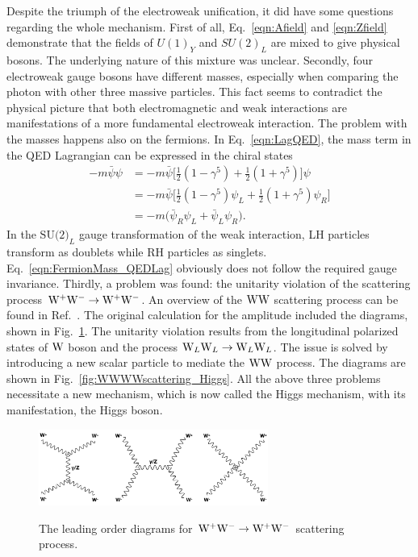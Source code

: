 Despite the triumph of the electroweak unification, it did have some questions regarding the whole mechanism. First of all, Eq.~\ref{eqn:Afield} and \ref{eqn:Zfield} demonstrate that the fields of $U(1)_{Y}$ and $SU(2)_{L}$ are mixed to give physical bosons. The underlying nature of this mixture was unclear. Secondly, four electroweak gauge bosons have different masses, especially when comparing the photon with other three massive particles. This fact seems to contradict the physical picture that both electromagnetic and weak interactions are manifestations of a more fundamental electroweak interaction. The problem with the masses happens also on the fermions. In Eq.~\ref{eqn:LagQED}, the mass term in the QED Lagrangian can be expressed in the chiral states
\begin{equation}
\label{eqn:FermionMass_QEDLag}
\begin{split}
-m\bar{\psi}\psi & = -m\bar{\psi}\bigg[\frac{1}{2}(1-\gamma^{5})+\frac{1}{2}(1+\gamma^{5})\bigg]\psi \\
& = -m\bar{\psi}\bigg[\frac{1}{2}(1-\gamma^{5})\psi_{L}+\frac{1}{2}(1+\gamma^{5})\psi_{R}\bigg] \\
& = -m\big(\bar{\psi}_{R}\psi_{L}+\bar{\psi}_L\psi_{R}\big). 
\end{split}
\end{equation}
In the $\text{SU(2)}_{L}$ gauge transformation of the weak interaction, LH particles transform as doublets while RH particles as singlets. Eq.~\ref{eqn:FermionMass_QEDLag} obviously does not follow the required gauge invariance.
Thirdly, a problem was found: the unitarity violation of the scattering process $\mathrm{W}^{+}\mathrm{W}^{-}\to\mathrm{W}^{+}\mathrm{W}^{-}$. An overview of the $\mathrm{W}\mathrm{W}$ scattering process can be found in Ref.~\cite{Szleper:2014xxa}. The original calculation for the amplitude included the diagrams, shown in Fig.~\ref{fig:WWWWscattering1}. The unitarity violation results from the longitudinal polarized states of $\mathrm{W}$ boson and the process $\mathrm{W}_{L}\mathrm{W}_{L}\to\mathrm{W}_{L}\mathrm{W}_{L}$. The issue is solved by introducing a new scalar particle to mediate the $\mathrm{W}\mathrm{W}$ process. The diagrams are shown in Fig.~\ref{fig:WWWWscattering_Higgs}.
All the above three problems necessitate a new mechanism, which is now called the Higgs mechanism, with its manifestation, the Higgs boson. 
\begin{figure}[!ht]
  \begin{center}  
    \includegraphics[width=0.67\textwidth]{Fig/WWWWscattering}\\
    \caption{The leading order diagrams for $\mathrm{W}^{+}\mathrm{W}^{-}\to\mathrm{W}^{+}\mathrm{W}^{-}$ scattering process. \label{fig:WWWWscattering1}}  
  \end{center}
\end{figure}

